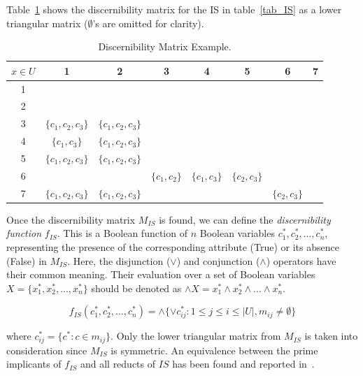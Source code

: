 \documentclass[authoryear,11pt]{elsarticle}
\begin{document}
  Table~\ref{tab_DM} shows the discernibility matrix for the IS in table~\ref{tab_IS} as a lower triangular 
  matrix ($\emptyset$'s are omitted for clarity).
  
   \begin{table}[htb]
		\caption{Discernibility Matrix Example.} \label{tab_DM}
		\centering
 	\begin{tabular}{c|ccccccc}
 		$x \in U$ & 1 & 2 &  3 & 4 & 5 &  6 & 7\\
 		\hline
		1 &&&&&&&\\
		2 &&&&&&&\\
		3 & $\lbrace c_1,c_2,c_3\rbrace$ & $\lbrace c_1,c_2,c_3\rbrace$ &&&&&\\
		4 & $\lbrace c_1,c_3\rbrace$ & $\lbrace c_1,c_2,c_3\rbrace$ &&&&&\\
		5 & $\lbrace c_1,c_2,c_3\rbrace$ & $\lbrace c_1,c_2,c_3\rbrace$ &&&&&\\
		6 &&& $\lbrace c_1,c_2\rbrace$ & $\lbrace c_1,c_3\rbrace$ & $\lbrace c_2,c_3\rbrace$ &&\\
		7 & $\lbrace c_1,c_2,c_3\rbrace$ & $\lbrace c_1,c_2,c_3\rbrace$ &&&& $\lbrace c_2,c_3\rbrace$ &\\
 	\end{tabular}             
 \end{table}
  
  Once the discernibility matrix $M_{IS}$ is found, we can define the \textit{discernibility function} $f_{IS}$.
  This is a Boolean function of $n$ Boolean variables $c_1^*, c_2^*,...,c_n^*$, representing the presence of
  the corresponding attribute (True) or its absence (False) in $M_{IS}$. Here, the disjunction ($\vee$) and 
  conjunction ($\wedge$) operators have their common meaning. Their evaluation over a set of Boolean variables
  $X=\lbrace x_1^*, x_2^*, ..., x_n^* \rbrace$ should be denoted as 
  $\wedge X= x_1^* \wedge x_2^* \wedge ... \wedge x_n^* $.

  \begin{equation}
  	f_{IS}(c_1^*, c_2^*,...,c_n^*)=\wedge \lbrace \vee c_{ij}^* : 1 \leq j \leq i \leq |U|, 
  									m_{ij} \neq \emptyset \rbrace
  \end{equation}

  where $c_{ij}^*=\lbrace c^* : c \in m_{ij} \rbrace$. Only the lower triangular matrix from $M_{IS}$ is
  taken into consideration since $M_{IS}$ is symmetric. An equivalence between the prime implicants of
  $f_{IS}$ and all reducts of $IS$ has been found and reported in~\citep{Pawlak07}.
  
\end{document}
